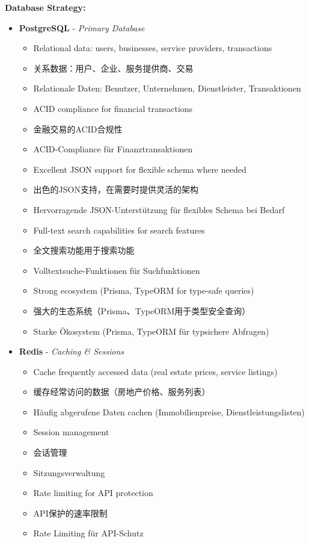 \textbf{Database Strategy:}
\begin{itemize}
    \item \textbf{PostgreSQL} - \textit{Primary Database}
    \begin{itemize}
        \item Relational data: users, businesses, service providers, transactions
        \item 关系数据：用户、企业、服务提供商、交易
        \item Relationale Daten: Benutzer, Unternehmen, Dienstleister, Transaktionen
        \item ACID compliance for financial transactions
        \item 金融交易的ACID合规性
        \item ACID-Compliance für Finanztransaktionen
        \item Excellent JSON support for flexible schema where needed
        \item 出色的JSON支持，在需要时提供灵活的架构
        \item Hervorragende JSON-Unterstützung für flexibles Schema bei Bedarf
        \item Full-text search capabilities for search features
        \item 全文搜索功能用于搜索功能
        \item Volltextsuche-Funktionen für Suchfunktionen
        \item Strong ecosystem (Prisma, TypeORM for type-safe queries)
        \item 强大的生态系统（Prisma、TypeORM用于类型安全查询）
        \item Starke Ökosystem (Prisma, TypeORM für typsichere Abfragen)
    \end{itemize}
    
    \item \textbf{Redis} - \textit{Caching \& Sessions}
    \begin{itemize}
        \item Cache frequently accessed data (real estate prices, service listings)
        \item 缓存经常访问的数据（房地产价格、服务列表）
        \item Häufig abgerufene Daten cachen (Immobilienpreise, Dienstleistungslisten)
        \item Session management
        \item 会话管理
        \item Sitzungsverwaltung
        \item Rate limiting for API protection
        \item API保护的速率限制
        \item Rate Limiting für API-Schutz
    \end{itemize}
    

\end{itemize}
